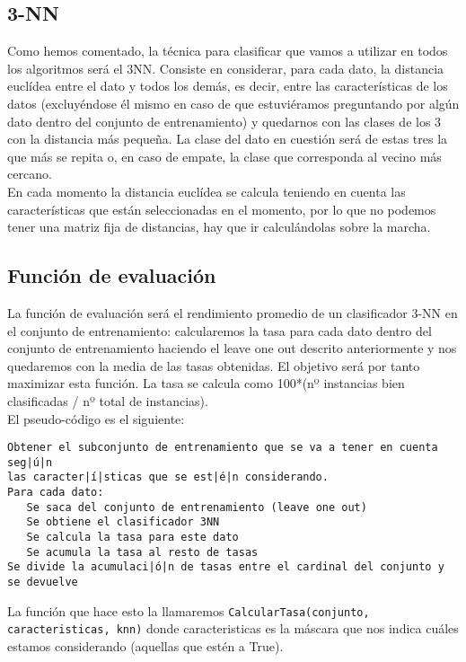 \documentclass[12pt]{article}
\begin{document}
\subsection{3-NN}
Como hemos comentado, la técnica para clasificar que vamos a utilizar en todos los algoritmos será el 3NN. Consiste en considerar, para cada dato, la distancia euclídea entre el dato y todos los demás, es decir, entre las características de los datos (excluyéndose él mismo en caso de que estuviéramos preguntando por algún dato dentro del conjunto de entrenamiento) y quedarnos con las clases de los 3 con la distancia más pequeña. La clase del dato en cuestión será de estas tres la que más se repita o, en caso de empate, la clase que corresponda al vecino más cercano.\\
En cada momento la distancia euclídea se calcula teniendo en cuenta las características que están seleccionadas en el momento, por lo que no podemos tener una matriz fija de distancias, hay que ir calculándolas sobre la marcha.

\subsection{Función de evaluación}
La función de evaluación será el rendimiento promedio de un clasificador 3-NN en el conjunto de entrenamiento: calcularemos la tasa para cada dato dentro del conjunto de entrenamiento haciendo el leave one out descrito anteriormente y nos quedaremos con la media de las tasas obtenidas. El objetivo será por tanto maximizar esta función.
La tasa se calcula como 100*(nº instancias bien clasificadas / nº total de instancias).\\

El pseudo-código es el siguiente:\\
\begin{lstlisting}
Obtener el subconjunto de entrenamiento que se va a tener en cuenta seg|ú|n 
las caracter|í|sticas que se est|é|n considerando.
Para cada dato:
   Se saca del conjunto de entrenamiento (leave one out)
   Se obtiene el clasificador 3NN
   Se calcula la tasa para este dato
   Se acumula la tasa al resto de tasas
Se divide la acumulaci|ó|n de tasas entre el cardinal del conjunto y se devuelve
\end{lstlisting}
La función que hace esto la llamaremos \texttt{CalcularTasa(conjunto, caracteristicas, knn)} donde caracteristicas es la máscara que nos indica cuáles estamos considerando (aquellas que estén a True).\\
\end{document}
